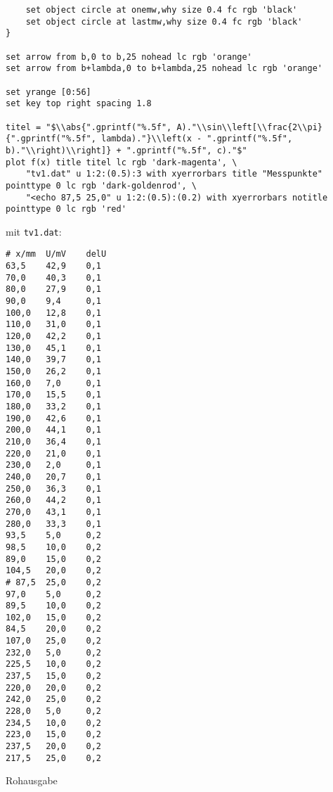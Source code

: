 {\begin{verbatim}
    set object circle at onemw,why size 0.4 fc rgb 'black'
    set object circle at lastmw,why size 0.4 fc rgb 'black'
}

set arrow from b,0 to b,25 nohead lc rgb 'orange'
set arrow from b+lambda,0 to b+lambda,25 nohead lc rgb 'orange'

set yrange [0:56]
set key top right spacing 1.8

titel = "$\\abs{".gprintf("%.5f", A)."\\sin\\left[\\frac{2\\pi}{".gprintf("%.5f", lambda)."}\\left(x - ".gprintf("%.5f", b)."\\right)\\right]} + ".gprintf("%.5f", c)."$"
plot f(x) title titel lc rgb 'dark-magenta', \
    "tv1.dat" u 1:2:(0.5):3 with xyerrorbars title "Messpunkte" pointtype 0 lc rgb 'dark-goldenrod', \
    "<echo 87,5 25,0" u 1:2:(0.5):(0.2) with xyerrorbars notitle pointtype 0 lc rgb 'red'
        \end{verbatim}
    }
    mit \texttt{tv1.dat}:
    \begin{multicols}{3}
        \begin{verbatim}
# x/mm  U/mV    delU
63,5    42,9    0,1
70,0    40,3    0,1
80,0    27,9    0,1
90,0    9,4     0,1
100,0   12,8    0,1
110,0   31,0    0,1
120,0   42,2    0,1
130,0   45,1    0,1
140,0   39,7    0,1
150,0   26,2    0,1
160,0   7,0     0,1
170,0   15,5    0,1
180,0   33,2    0,1
190,0   42,6    0,1
200,0   44,1    0,1
210,0   36,4    0,1
220,0   21,0    0,1
230,0   2,0     0,1
240,0   20,7    0,1
250,0   36,3    0,1
260,0   44,2    0,1
270,0   43,1    0,1
280,0   33,3    0,1
93,5    5,0     0,2
98,5    10,0    0,2
89,0    15,0    0,2
104,5   20,0    0,2
# 87,5  25,0    0,2
97,0    5,0     0,2
89,5    10,0    0,2
102,0   15,0    0,2
84,5    20,0    0,2
107,0   25,0    0,2
232,0   5,0     0,2
225,5   10,0    0,2
237,5   15,0    0,2
220,0   20,0    0,2
242,0   25,0    0,2
228,0   5,0     0,2
234,5   10,0    0,2
223,0   15,0    0,2
237,5   20,0    0,2
217,5   25,0    0,2
        \end{verbatim}
    \end{multicols}
    \vspace{-\baselineskip}
    Rohausgabe
